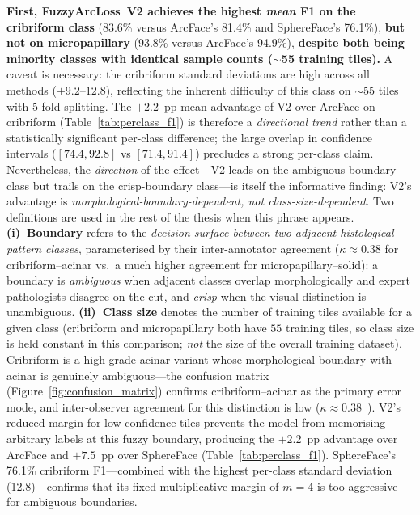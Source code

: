 \textbf{First, FuzzyArcLoss~V2 achieves the highest \emph{mean} F1 on
the cribriform class} (83.6\% versus ArcFace's 81.4\% and SphereFace's
76.1\%), \textbf{but not on micropapillary} (93.8\% versus ArcFace's
94.9\%), \textbf{despite both being minority classes with identical
sample counts ($\sim$55 training tiles).}
A caveat is necessary: the cribriform standard deviations are high
across all methods ($\pm 9.2$--$12.8$), reflecting the inherent
difficulty of this class on $\sim$55 tiles with 5-fold splitting.
The $+2.2$~pp mean advantage of V2 over ArcFace on cribriform
(Table~\ref{tab:perclass_f1}) is
therefore a \emph{directional trend} rather than a statistically
significant per-class difference; the large overlap in confidence
intervals ($[74.4, 92.8]$ vs $[71.4, 91.4]$) precludes a strong
per-class claim.
Nevertheless, the \emph{direction} of the effect---V2 leads on the
ambiguous-boundary class but trails on the crisp-boundary class---is
itself the informative finding: V2's advantage is
\emph{morphological-boundary-dependent, not class-size-dependent}.
Two definitions are used in the rest of the thesis when this
phrase appears.
\textbf{(i)~Boundary} refers to the \emph{decision surface
between two adjacent histological pattern classes}, parameterised
by their inter-annotator agreement
($\kappa \approx 0.38$ for cribriform--acinar
\cite{thunnissen2012reproducibility} vs.\ a much higher
agreement for micropapillary--solid): a boundary is
\emph{ambiguous} when adjacent classes overlap morphologically
and expert pathologists disagree on the cut, and
\emph{crisp} when the visual distinction is unambiguous.
\textbf{(ii)~Class size} denotes the number of training tiles
available for a given class (cribriform and micropapillary both
have $55$ training tiles, so class size is held constant in this
comparison; \emph{not} the size of the overall training dataset).
Cribriform is a high-grade acinar variant whose morphological boundary
with acinar is genuinely ambiguous---the confusion matrix
(Figure~\ref{fig:confusion_matrix}) confirms cribriform--acinar as
the primary error mode, and inter-observer agreement for this
distinction is low ($\kappa \approx 0.38$~\cite{thunnissen2012reproducibility}).
V2's reduced margin for low-confidence tiles prevents the model from
memorising arbitrary labels at this fuzzy boundary, producing the
$+2.2$~pp advantage over ArcFace and $+7.5$~pp over SphereFace
(Table~\ref{tab:perclass_f1}).
SphereFace's 76.1\% cribriform F1---combined with the highest per-class
standard deviation (12.8)---confirms that its fixed multiplicative
margin of $m = 4$ is too aggressive for ambiguous boundaries.

